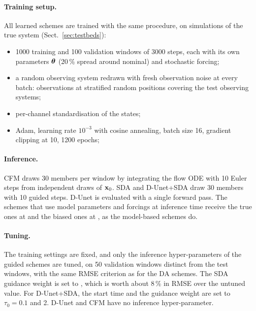 \paragraph{Training setup.}
All learned schemes are trained with the same procedure, on simulations of the
true system (Sect.~\ref{sec:testbeds}):
\begin{itemize}[leftmargin=*,nosep]
  \item 1000 training and 100 validation windows of 3000 steps, each with its own
    parameters $\boldsymbol{\theta}$ (20\,\% spread around nominal) and stochastic forcing;
  \item a random observing system redrawn with fresh observation noise at every batch:
    observations at stratified random positions covering the test observing systems;
  \item per-channel standardisation of the states;
  \item Adam, learning rate $10^{-3}$ with cosine annealing, batch size 16,
    gradient clipping at 10, 1200 epochs;
\end{itemize}

\paragraph{Inference.}
CFM draws 30 members per window by integrating the flow ODE with
10 Euler steps from independent draws of $\mathbf{x}_0$. SDA and D-Unet+SDA
draw 30 members with 10 guided steps. D-Unet is evaluated with a single
forward pass. The schemes that use model parameters and forcings at inference time receive the true
ones at \Sz{} and the biased ones at \So{}, as the model-based schemes do.

\paragraph{Tuning.}
The training settings are fixed, and only the inference hyper-parameters of the
guided schemes are tuned, on 50 validation windows distinct from the test windows,
with the same RMSE criterion as for the DA schemes. The SDA guidance weight is
set to , which is worth about 8\,\% in RMSE over the untuned value.
For D-Unet+SDA, the start time and the guidance weight are set to $\tau_0 = 0.1$
and 2. D-Unet and CFM have no inference hyper-parameter.


